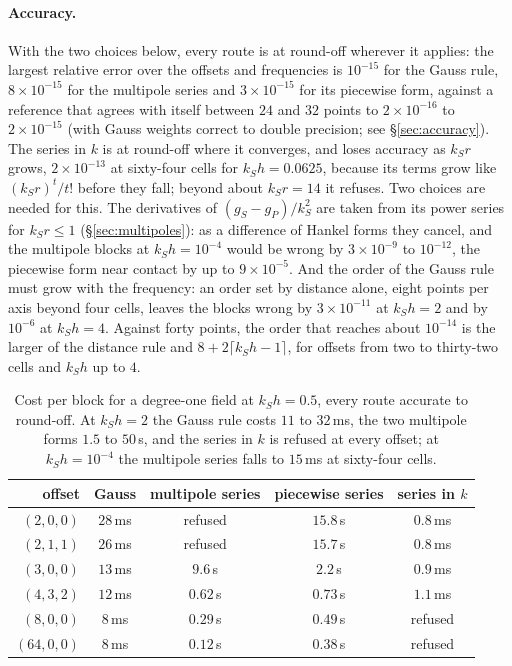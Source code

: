 \documentclass[11pt,a4paper]{article}
\begin{document}
\paragraph{Accuracy.} With the two choices below, every route is at round-off wherever it applies: the
largest relative error over the offsets and frequencies is $10^{-15}$ for the Gauss rule, $8\times10^{-15}$
for the multipole series and $3\times10^{-15}$ for its piecewise form, against a reference that agrees with
itself between $24$ and $32$ points to $2\times10^{-16}$ to $2\times10^{-15}$ (with Gauss weights correct to
double precision; see \S\ref{sec:accuracy}). The series in $k$ is at round-off where it converges, and loses
accuracy as $k_Sr$ grows, $2\times10^{-13}$ at sixty-four cells for $k_Sh=0.0625$, because its terms grow like $(k_Sr)^t/t!$ before
they fall; beyond about $k_Sr=14$ it refuses. Two choices are needed for this. The derivatives of
$(g_S-g_P)/k_S^2$ are taken from its power series for $k_Sr\le1$ (\S\ref{sec:multipoles}): as a difference
of Hankel forms they cancel, and the multipole blocks at $k_Sh=10^{-4}$ would be wrong by $3\times10^{-9}$
to $10^{-12}$, the piecewise form near contact by up to $9\times10^{-5}$. And the order of the Gauss rule
must grow with the frequency: an order set by distance alone, eight points per axis beyond four cells,
leaves the blocks wrong by $3\times10^{-11}$ at $k_Sh=2$ and by $10^{-6}$ at $k_Sh=4$. Against
forty points, the order that reaches about $10^{-14}$ is the larger of the distance rule and
$8+2\lceil k_Sh-1\rceil$, for offsets from two to thirty-two cells and $k_Sh$ up to $4$.

\begin{table}[h]
\centering
\small
\begin{tabular}{rcccc}
\toprule
offset & Gauss & multipole series & piecewise series & series in $k$ \\
\midrule
$(2,0,0)$ & $28$\,ms & refused & $15.8$\,s & $0.8$\,ms \\
$(2,1,1)$ & $26$\,ms & refused & $15.7$\,s & $0.8$\,ms \\
$(3,0,0)$ & $13$\,ms & $9.6$\,s & $2.2$\,s & $0.9$\,ms \\
$(4,3,2)$ & $12$\,ms & $0.62$\,s & $0.73$\,s & $1.1$\,ms \\
$(8,0,0)$ & $8$\,ms & $0.29$\,s & $0.49$\,s & refused \\
$(64,0,0)$ & $8$\,ms & $0.12$\,s & $0.38$\,s & refused \\
\bottomrule
\end{tabular}
\caption{Cost per block for a degree-one field at $k_Sh=0.5$, every route accurate to round-off. At
$k_Sh=2$ the Gauss rule costs $11$ to $32$\,ms, the two multipole forms $1.5$ to $50$\,s, and the series
in $k$ is refused at every offset; at $k_Sh=10^{-4}$ the multipole series falls to $15$\,ms at sixty-four
cells.}
\label{tab:distant}
\end{table}
\end{document}
